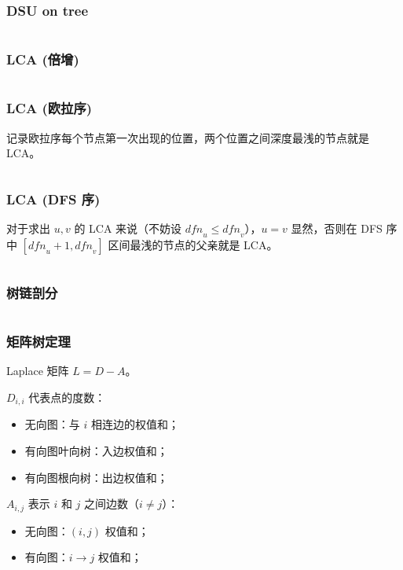 \documentclass[twoside,twocolumn]{article}
\begin{document}
\subsubsection{DSU on tree} %
\inputminted[breaklines, frame=single]{c++}{../algo/图论/树/dsu_on_tree.cpp}


\subsubsection{LCA (倍增)} %
\inputminted[breaklines, frame=single]{c++}{../algo/图论/树/LCA【倍增】.cpp}


\subsubsection{LCA (欧拉序)} %
记录欧拉序每个节点第一次出现的位置，两个位置之间深度最浅的节点就是 LCA。
\inputminted[breaklines, frame=single]{c++}{../algo/图论/树/LCA【欧拉序】.cpp}


\subsubsection{LCA (DFS 序)} %
对于求出 $u,v$ 的 LCA 来说（不妨设 $\textit{dfn}_u\le \textit{dfn}_v$），$u=v$ 显然，否则在 DFS 序中 $[\textit{dfn}_u+1,\textit{dfn}_v]$ 区间最浅的节点的父亲就是 LCA。
\inputminted[breaklines, frame=single]{c++}{../algo/图论/树/LCA【dfs序】.cpp}



\subsubsection{树链剖分} %
\inputminted[breaklines, frame=single]{c++}{../algo/图论/树/树链剖分【非封装版】.cpp}


\subsubsection{矩阵树定理} %

Laplace 矩阵 $L=D-A$。



\begin{minipage}[t]{0.45\textwidth}
    $D_{i,i}$ 代表点的度数：
    \begin{itemize}[noitemsep, topsep=-5pt]
        \item 无向图：与 $i$ 相连边的权值和；
        \item 有向图叶向树：入边权值和；
        \item 有向图根向树：出边权值和；
    \end{itemize}
\end{minipage}
\hfill
\begin{minipage}[t]{0.45\textwidth}
    $A_{i,j}$ 表示 $i$ 和 $j$ 之间边数（$i\ne j$）：
    \begin{itemize}[noitemsep, topsep=-5pt]
        \item 无向图：$(i,j)$ 权值和；
        \item 有向图：$i\to j$ 权值和；
    \end{itemize}
\end{minipage}
\bigskip
\end{document}
